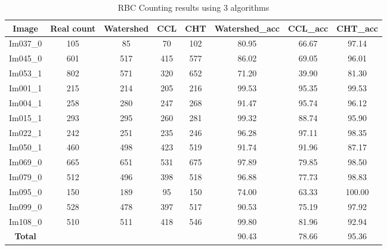 \begin{table}[H]
\centering
\begin{tabular}{|  c | c | c | c | c | c | c | c |}
\hline
\textbf{Image} & \textbf{Real count} & \textbf{Watershed} & \textbf{CCL} & \textbf{CHT} & \textbf{Watershed\_acc} & \textbf{CCL\_acc} & \textbf{CHT\_acc} \\
\hline
Im037\_0 & 105 & 85 & 70 & 102 & 80.95 & 66.67 & 97.14 \\
Im045\_0 & 601 & 517 & 415 & 577 & 86.02 & 69.05 & 96.01 \\
Im053\_1 & 802 & 571 & 320 & 652 & 71.20 & 39.90 & 81.30 \\
Im001\_1 & 215 & 214 & 205 & 216 & 99.53 & 95.35 & 99.53 \\
Im004\_1 & 258 & 280 & 247 & 268 & 91.47 & 95.74 & 96.12 \\
Im015\_1 & 293 & 295 & 260 & 281 & 99.32 & 88.74 & 95.90 \\
Im022\_1 & 242 & 251 & 235 & 246 & 96.28 & 97.11 & 98.35 \\
Im050\_1 & 460 & 498 & 423 & 519 & 91.74 & 91.96 & 87.17 \\
Im069\_0 & 665 & 651 & 531 & 675 & 97.89 & 79.85 & 98.50 \\
Im079\_0 & 512 & 496 & 398 & 518 & 96.88 & 77.73 & 98.83 \\
Im095\_0 & 150 & 189 & 95 & 150 & 74.00 & 63.33 & 100.00 \\
Im099\_0 & 528 & 478 & 397 & 517 & 90.53 & 75.19 & 97.92 \\
Im108\_0 & 510 & 511 & 418 & 546 & 99.80 & 81.96 & 92.94 \\
\hline
\textbf{Total} &  &  &  &  & 90.43 & 78.66 & 95.36 \\
\hline
\end{tabular}
\caption{RBC Counting results using 3 algorithms}
\label{table:DOUNET-RBC}
\end{table}
